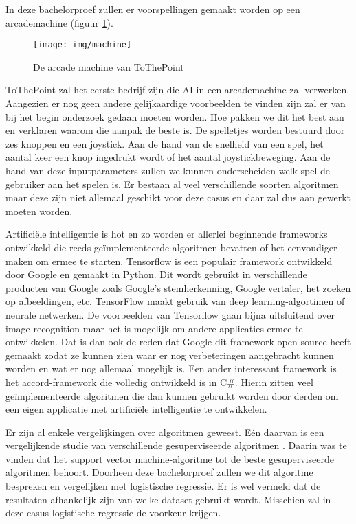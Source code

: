 In deze bachelorproef zullen er voorspellingen gemaakt worden op een arcademachine (figuur \ref{fig:arcademachine}).
\begin{figure}
	\centering
	\texttt{[image: img/machine]}
	\caption{De arcade machine van ToThePoint}
	\label{fig:arcademachine}
\end{figure} ToThePoint zal het eerste bedrijf zijn die AI in een arcademachine zal verwerken. Aangezien er nog geen andere gelijkaardige voorbeelden te vinden zijn zal er van bij het begin onderzoek gedaan moeten worden. Hoe pakken we dit het best aan en verklaren waarom die aanpak de beste is. De spelletjes worden bestuurd door zes knoppen en een joystick. Aan de hand van de snelheid van een spel, het aantal keer een knop ingedrukt wordt of het aantal joystickbeweging. Aan de hand van deze inputparameters zullen we kunnen onderscheiden welk spel de gebruiker aan het spelen is. Er bestaan al veel verschillende soorten algoritmen maar deze zijn niet allemaal geschikt voor deze casus en daar zal dus aan gewerkt moeten worden. 

Artificiële intelligentie is hot en zo worden er allerlei beginnende frameworks ontwikkeld die reeds geïmplementeerde algoritmen bevatten of het eenvoudiger maken om ermee te starten. 
Tensorflow is een populair framework ontwikkeld door Google en gemaakt in Python. Dit wordt gebruikt in verschillende producten van Google zoals Google's stemherkenning, Google vertaler, het zoeken op afbeeldingen, etc.
TensorFlow maakt gebruik van deep learning-algortimen of neurale netwerken. De voorbeelden van Tensorflow gaan bijna uitsluitend over image recognition maar het is mogelijk om andere applicaties ermee te ontwikkelen. Dat is dan ook de reden dat Google dit framework open source heeft gemaakt zodat ze kunnen zien waar er nog verbeteringen aangebracht kunnen worden en wat er nog allemaal mogelijk is. \autocite{GooglesTensorflow}
Een ander interessant framework is het accord-framework \autocite{accord} die volledig ontwikkeld is in C\#. Hierin zitten veel geïmplementeerde algoritmen die dan kunnen gebruikt worden door derden om een eigen applicatie met artificiële intelligentie te ontwikkelen. 

Er zijn al enkele vergelijkingen over algoritmen geweest. Eén daarvan is een vergelijkende studie van verschillende gesuperviseerde algoritmen \autocite{vergelijkingSupervised}. Daarin was te vinden dat het support vector machine-algoritme tot de beste gesuperviseerde algoritmen behoort. Doorheen deze bachelorproef zullen we dit algoritme bespreken en vergelijken met logistische regressie. Er is wel vermeld dat de resultaten afhankelijk zijn van welke dataset gebruikt wordt. Misschien zal in deze casus logistische regressie de voorkeur krijgen.

